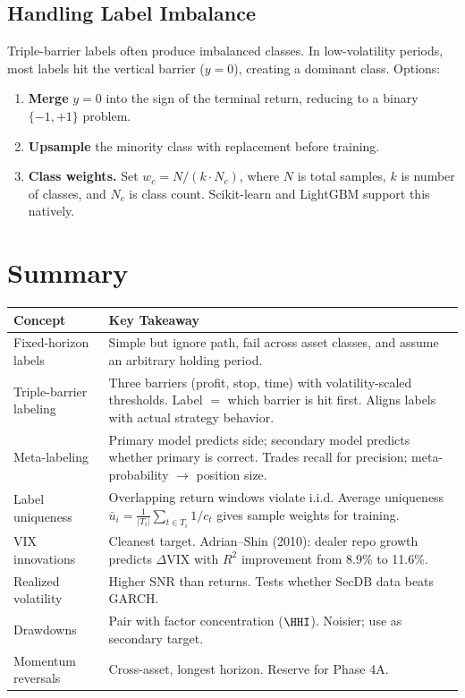 \subsection{Handling Label Imbalance}

Triple-barrier labels often produce imbalanced classes.
In low-volatility periods, most labels hit the vertical barrier
($y = 0$), creating a dominant class.
Options:

\begin{enumerate}[leftmargin=2em]
\item \textbf{Merge} $y=0$ into the sign of the terminal return,
reducing to a binary $\{-1, +1\}$ problem.
\item \textbf{Upsample} the minority class with replacement before training.
\item \textbf{Class weights.} Set
$w_c = N / (k \cdot N_c)$, where $N$ is total samples, $k$ is number
of classes, and $N_c$ is class count.
Scikit-learn and LightGBM support this natively.
\end{enumerate}


\section{Summary}
\label{sec:labeling-summary}

\begin{center}
\begin{tabular}{p{3.8cm} p{9.5cm}}
\toprule
\textbf{Concept} & \textbf{Key Takeaway} \\
\midrule
Fixed-horizon labels &
Simple but ignore path, fail across asset classes, and assume
an arbitrary holding period. \\[4pt]
Triple-barrier labeling &
Three barriers (profit, stop, time) with volatility-scaled thresholds.
Label $= $ which barrier is hit first.
Aligns labels with actual strategy behavior. \\[4pt]
Meta-labeling &
Primary model predicts side; secondary model predicts whether primary
is correct. Trades recall for precision; meta-probability $\to$
position size. \\[4pt]
Label uniqueness &
Overlapping return windows violate i.i.d.
Average uniqueness $\bar{u}_i = \frac{1}{|T_i|}\sum_{t \in T_i} 1/c_t$
gives sample weights for training. \\[4pt]
VIX innovations &
Cleanest target. Adrian--Shin (2010): dealer repo growth predicts
$\Delta$VIX with $R^2$ improvement from 8.9\% to 11.6\%. \\[4pt]
Realized volatility &
Higher SNR than returns. Tests whether SecDB data beats GARCH. \\[4pt]
Drawdowns &
Pair with factor concentration ($\HHI$). Noisier; use as secondary target. \\[4pt]
Momentum reversals &
Cross-asset, longest horizon. Reserve for Phase 4A. \\
\bottomrule
\end{tabular}
\end{center}

